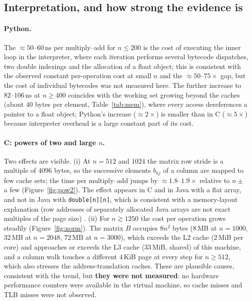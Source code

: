 \subsection{Interpretation, and how strong the evidence is}
\paragraph{Python.} The $\approx50$--$60$\,ns per multiply--add for $n\le200$ is the cost of executing the inner loop in the
interpreter, where each iteration performs several bytecode dispatches, two double indexings and the allocation of a float object;
this is consistent with the observed constant per-operation cost at small $n$ and the $\approx50$--$75\times$ gap, but the cost
of individual bytecodes was not measured here. The further increase to $82$--$106$\,ns at $n\ge400$ coincides with the working set
growing beyond the caches (about $40$ bytes per element, Table~\ref{tab:mem}), where every access dereferences a pointer to a float
object; Python's increase ($\approx2\times$) is smaller than in C ($\approx5\times$) because interpreter overhead is a large constant part of its cost.

\paragraph{C: powers of two and large $n$.} Two effects are visible. (i) At $n=512$ and $1024$ the matrix row stride is a multiple of
$4096$ bytes, so the successive elements $b_{kj}$ of a column are mapped to few cache sets; the time per multiply--add jumps by
$\approx1.8$--$1.9\times$ relative to $n\pm$ a few (Figure~\ref{fig:pow2}). The effect appears in C and in Java with a flat array,
and not in Java with \texttt{double[n][n]}, which is consistent with a memory-layout explanation (row addresses of separately allocated
Java arrays are not exact multiples of the page size) \cite{drepper,hennessy}. (ii) For $n\gtrsim1250$ the cost per operation grows
steadily (Figure~\ref{fig:norm}). The matrix $B$ occupies $8n^2$ bytes ($8$\,MB at $n=1000$, $32$\,MB at $n=2048$, $72$\,MB at $n=3000$),
which exceeds the L2 cache ($2$\,MiB per core) and approaches or exceeds the L3 cache ($33$\,MiB, shared) of this machine, and a column
walk touches a different $4$\,KiB page at every step for $n\ge512$, which also stresses the address-translation caches. These are plausible
causes, consistent with the trend, but \textbf{they were not measured}: no hardware performance counters were available in the virtual
machine, so cache misses and TLB misses were not observed.

